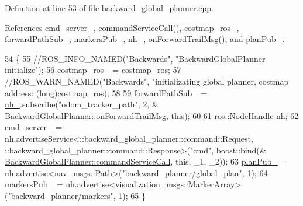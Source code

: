Definition at line 53 of file backward\+\_\+global\+\_\+planner.\+cpp.



References cmd\+\_\+server\+\_\+, command\+Service\+Call(), costmap\+\_\+ros\+\_\+, forward\+Path\+Sub\+\_\+, markers\+Pub\+\_\+, nh\+\_\+, on\+Forward\+Trail\+Msg(), and plan\+Pub\+\_\+.


\begin{DoxyCode}
54 \{
55     \textcolor{comment}{//ROS\_INFO\_NAMED("Backwards", "BackwardGlobalPlanner initialize");}
56     \hyperlink{classcl__move__base__z_1_1backward__global__planner_1_1BackwardGlobalPlanner_a7103c15e6540a514acd421c3c6e194a4}{costmap\_ros\_} = costmap\_ros;
57     \textcolor{comment}{//ROS\_WARN\_NAMED("Backwards", "initializating global planner, costmap address: %
       (long)costmap\_ros);}
58 
59     \hyperlink{classcl__move__base__z_1_1backward__global__planner_1_1BackwardGlobalPlanner_a27fbf960495d95b87cc50e8556c79d9f}{forwardPathSub\_} = \hyperlink{classcl__move__base__z_1_1backward__global__planner_1_1BackwardGlobalPlanner_adeb0df38d8dcde919b732724420a401f}{nh\_}.subscribe(\textcolor{stringliteral}{"odom\_tracker\_path"}, 2, &
      \hyperlink{classcl__move__base__z_1_1backward__global__planner_1_1BackwardGlobalPlanner_a515bde5bfb3ae548f3e19209df1a48b0}{BackwardGlobalPlanner::onForwardTrailMsg}, \textcolor{keyword}{this});
60 
61     ros::NodeHandle nh;
62     \hyperlink{classcl__move__base__z_1_1backward__global__planner_1_1BackwardGlobalPlanner_a77a63b85852ee58b5a142e1361bf984e}{cmd\_server\_} = nh.advertiseService<::backward\_global\_planner::command::Request, 
      ::backward\_global\_planner::command::Response>(\textcolor{stringliteral}{"cmd"}, boost::bind(&
      \hyperlink{classcl__move__base__z_1_1backward__global__planner_1_1BackwardGlobalPlanner_a9884ef48689e81be9a4b6d784c62ac01}{BackwardGlobalPlanner::commandServiceCall}, \textcolor{keyword}{this}, \_1, \_2));
63     \hyperlink{classcl__move__base__z_1_1backward__global__planner_1_1BackwardGlobalPlanner_a561eab039140948c52ec928c191f3f43}{planPub\_} = nh.advertise<nav\_msgs::Path>(\textcolor{stringliteral}{"backward\_planner/global\_plan"}, 1);
64     \hyperlink{classcl__move__base__z_1_1backward__global__planner_1_1BackwardGlobalPlanner_a6f80f7041c8cdc93e1f3dfd0e723654a}{markersPub\_} = nh.advertise<visualization\_msgs::MarkerArray>(\textcolor{stringliteral}{"backward\_planner/markers"}, 1);
65 \}
\end{DoxyCode}


